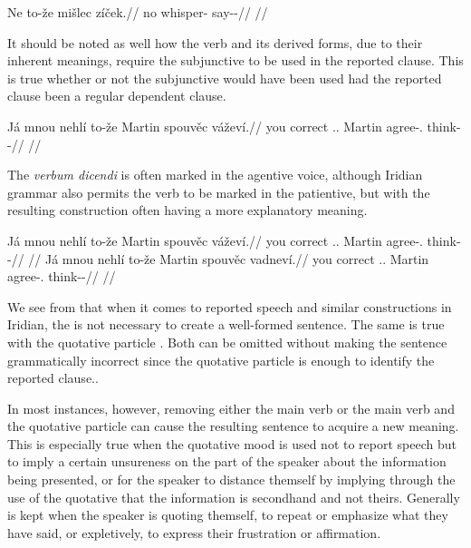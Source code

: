 \pex
\begingl
\gla Ne to-že mišlec zíček.//
\glb no  whisper-\Cv{} say-\Av{}-\Pf{}//
\glft {}//
\endgl
\xe

It should be noted as well how the verb  and its derived
forms, due to their inherent meanings, require the subjunctive to be used in the
reported clause. This is true whether or not the subjunctive would have been
used had the reported clause been a regular dependent clause.


\pex
\begingl
  \gla Já mnou nehlí to-že Martin spouvěc váževí.//
  \glb you correct \Cop{}.\Sbj{}.\Quot{} \Qp{} Martin agree-\Cv{}.\Ipf{} think-\Av{}-\Cont{}//
  \glft {}//
\endgl
\xe

The \emph{verbum dicendi} is often marked in the agentive voice, although
Iridian grammar also permits the verb to be marked in the patientive, but with
the resulting construction often having a more explanatory meaning.

\pex
\a
\begingl
  \gla Já mnou nehlí to-že Martin spouvěc váževí.//
  \glb you correct \Cop{}.\Sbj{}.\Quot{} \Qp{} Martin agree-\Cv{}.\Ipf{} think-\Av{}-\Cont{}//
  \glft {}//
\endgl
\a
\begingl
  \gla Já mnou nehlí to-že Martin spouvěc vadneví.//
  \glb you correct \Cop{}.\Sbj{}.\Quot{} \Qp{} Martin agree-\Cv{}.\Ipf{} think-\Pv{}-\Cont{}//
  \glft {}//
\endgl
\xe



We see from  that when it comes to reported speech and similar constructions in
Iridian, the  is not necessary to
create a well-formed sentence. The same is true with the quotative particle
. Both can be omitted without making the sentence grammatically
incorrect since the quotative particle is enough to identify the reported
clause..

In most instances, however, removing either the main verb or the main verb and
the quotative particle can cause the resulting sentence to acquire a new
meaning. This is especially true when the quotative mood is used not to report
speech but to imply a certain unsureness on the part of the speaker about the
information being presented, or for the speaker to distance themself by implying
through the use of the quotative that the information is secondhand and not
theirs. Generally  is kept when the speaker is quoting themself, to
repeat or emphasize what they have said, or expletively, to express their
frustration or affirmation.

